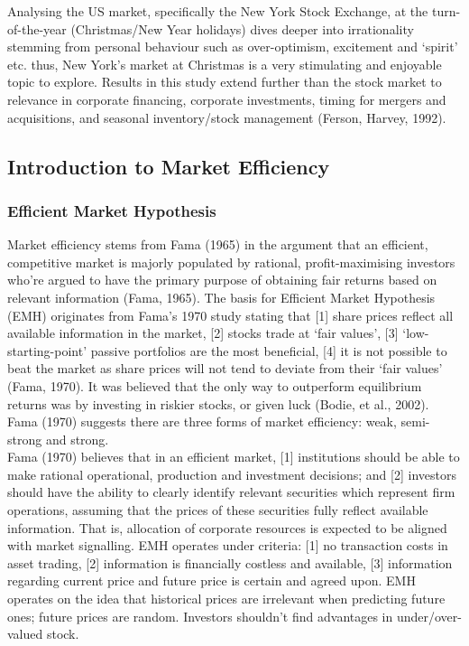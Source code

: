 \documentclass[11pt, english]{article}
\begin{document}
		Analysing the US market, specifically the New York Stock Exchange, at the turn-of-the-year (Christmas/New Year holidays) dives deeper into irrationality stemming from personal behaviour such as over-optimism, excitement and `spirit' etc. thus, New York’s market at Christmas is a very stimulating and enjoyable topic to explore. Results in this study extend further than the stock market to relevance in corporate financing, corporate investments, timing for mergers and acquisitions, and seasonal inventory/stock management (Ferson, Harvey, 1992).

	\newpage

	\subsection{Introduction to Market Efficiency}

		\subsubsection{Efficient Market Hypothesis}

		Market efficiency stems from Fama (1965) in the argument that an efficient, competitive market is majorly populated by rational, profit-maximising investors who’re argued to have the primary purpose of obtaining fair returns based on relevant information (Fama, 1965). The basis for Efficient Market Hypothesis (EMH) originates from Fama’s 1970 study stating that [1] share prices reflect all available information in the market, [2] stocks trade at `fair values', [3] `low-starting-point' passive portfolios are the most beneficial, [4] it is not possible to beat the market as share prices will not tend to deviate from their `fair values’ (Fama, 1970). It was believed that the only way to outperform equilibrium returns was by investing in riskier stocks, or given luck (Bodie, et al., 2002). Fama (1970) suggests there are three forms of market efficiency: weak, semi-strong and strong.\\

		Fama (1970) believes that in an efficient market, [1] institutions should be able to make rational operational, production and investment decisions; and [2] investors should have the ability to clearly identify relevant securities which represent firm operations, assuming that the prices of these securities fully reflect available information. That is, allocation of corporate resources is expected to be aligned with market signalling. EMH operates under criteria: [1] no transaction costs in asset trading, [2] information is financially costless and available, [3] information regarding current price and future price is certain and agreed upon. EMH operates on the idea that historical prices are irrelevant when predicting future ones; future prices are random. Investors shouldn’t find advantages in under/over-valued stock.\\
\end{document}
